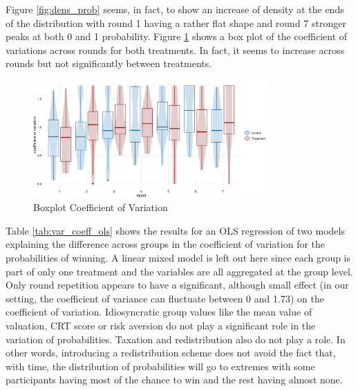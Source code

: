 Figure \ref{fig:dens_prob} seems, in fact, to show an increase of density at the ends of the distribution with round 1 having a rather flat shape and round 7 stronger peaks at both 0 and 1 probability. Figure \ref{fig:var_coeff_boxplot} shows a box plot of the coefficient of variations across rounds for both treatments. In fact, it seems to increase across rounds but not significantly between treatments.\\

\begin{figure}[H]
    \centering
    \includegraphics[width = 0.8\textwidth]{graphs/var_coeff_prob_boxplot.png}
    \caption{Boxplot Coefficient of Variation}
    \label{fig:var_coeff_boxplot}
\end{figure}

Table \ref{tab:var_coeff_ols} shows the results for an OLS regression of two models explaining the difference across groups in the coefficient of variation for the probabilities of winning. A linear mixed model is left out here since each group is part of only one treatment and the variables are all aggregated at the group level. Only round repetition appears to have a significant, although small effect (in our setting, the coefficient of variance can fluctuate between 0 and 1.73) on the coefficient of variation. Idiosyncratic group values like the mean value of valuation, CRT score or risk aversion do not play a significant role in the variation of probabilities. Taxation and redistribution also do not play a role. In other words, introducing a redistribution scheme does not avoid the fact that, with time, the distribution of probabilities will go to extremes with some participants having most of the chance to win and the rest having almost none.\\

